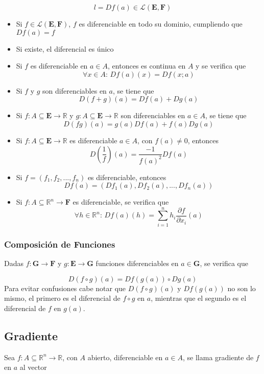 \[l=Df(a)\in\mathcal{L}(\mathbf{E},\mathbf{F})\]
\bigbreak
\begin{itemize}
    \item Si $f\in\mathcal{L}(\mathbf{E},\mathbf{F})$, $f$ es diferenciable en todo su dominio, cumpliendo que $Df(a) = f$
    \item Si existe, el diferencial es único
    \item Si $f$ es diferenciable en $a\in A$, entonces es continua en $A$ y se verifica que
    \[\forall x\in A:\,Df(a)(x) = Df(x;a)\]
    \item Si $f$ y $g$ son diferenciables en $a$, se tiene que
    \[D(f+g)(a)=Df(a)+Dg(a)\]
    \item Si $f:A\subseteq\mathbf{E}\to\mathbb{R}$ y $g:A\subseteq\mathbf{E}\to\mathbb{R}$ son diferenciables en $a\in A$, se tiene que
    \[D(fg)(a)=g(a)Df(a)+f(a)Dg(a)\]
    \item Si $f:A\subseteq\mathbf{E}\to\mathbb{R}$ es diferenciable $a\in A$, con $f(a)\neq 0$, entonces
    \[D\left(\frac{1}{f}\right)(a)=\frac{-1}{f(a)^2}Df(a)\]
    \item Si $f = (f_1, f_2, ..., f_n)$ es diferenciable, entonces
    \[Df(a)= (Df_1(a), Df_2(a), ..., Df_n(a))\]
    \item Si $f:A\subseteq\mathbb{R}^n\to\mathbf{F}$ es diferenciable, se verifica que
    \[\forall  h\in\mathbb{R}^n:\, Df(a)(h) =
    \sum^n_{i=1}h_i\frac{\partial f}{\partial x_i}(a)\]
\end{itemize}

\subsubsection{Composición de Funciones}

Dadas $f:\mathbf{G}\to\mathbf{F}$ y $g:\mathbf{E}\to\mathbf{G}$ funciones diferenciables en $a\in\mathbf{G}$, se verifica que

\[D(f\circ g)(a) = Df(g(a))\circ Dg(a)\]
\bigbreak
Para evitar confusiones cabe notar que $D(f\circ g)(a)$ y $Df(g(a))$ no son lo mismo, el primero es el diferencial de $f\circ g$ en $a$, mientras que el segundo es el diferencial de $f$ en $g(a)$.

\subsection{Gradiente}

Sea $f:A\subseteq\mathbb{R}^n\to\mathbb{R}$, con $A$ abierto, diferenciable en $a\in A$, se llama gradiente de $f$ en $a$ al vector

